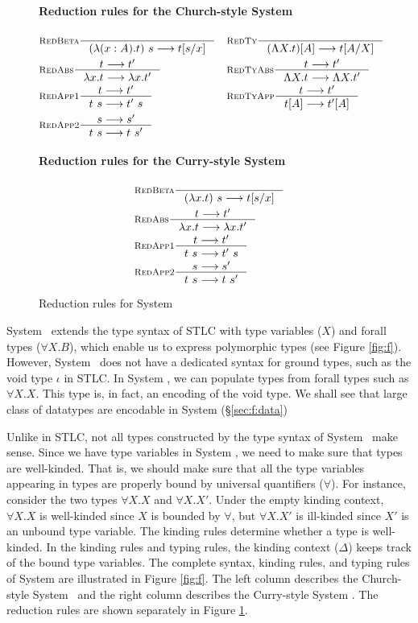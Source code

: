 \begin{figure}
\paragraph{Reduction rules for the Church-style System \F}
\begin{align*}
& \inference[\sc RedBeta]{}{(\l(x:A).t)~s --> t[s/x]}
&&\inference[\sc RedTy]{}{(\L X   .t)[A] --> t[A/X]} \\
& \inference[\sc RedAbs]{t --> t'}{\l x   .t --> \l x   .t'}
&&\inference[\sc RedTyAbs]{t --> t'}{\L X   .t --> \L X   .t'} \\
& \inference[\sc RedApp1]{t --> t'}{t~s --> t'~s}
&&\inference[\sc RedTyApp]{t --> t'}{t[A] --> t'[A]} \\
& \inference[\sc RedApp2]{s --> s'}{t~s --> t~s'}
\end{align*}
\paragraph{Reduction rules for the Curry-style System \F}
\begin{align*}
& \inference[\sc RedBeta]{}{(\l x   .t)~s --> t[s/x]} \\
& \inference[\sc RedAbs]{t --> t'}{\l x   .t --> \l x   .t'} \\
& \inference[\sc RedApp1]{t --> t'}{t~s --> t'~s} \\
& \inference[\sc RedApp2]{s --> s'}{t~s --> t~s'}
\end{align*}
\caption{Reduction rules for System \F}
\label{fig:redf}
\end{figure}

System \F\ extends the type syntax of STLC with type variables ($X$)
and forall types ($\forall X.B$), which enable us to express polymorphic types
(see Figure \ref{fig:f}). However, System \F\ does not have a dedicated syntax
for ground types, such as the void type $\iota$ in STLC. In System \F, we can
populate types from forall types such as $\forall X.X$. This type is, in fact,
an encoding of the void type. We shall see that large class of datatypes are
encodable in System \F (\S\ref{sec:f:data})

Unlike in STLC, not all types constructed by the type syntax of System \F\
make sense. Since we have type variables in System \F, we need to
make sure that types are well-kinded. That is, we should make sure
that all the type variables appearing in types are properly bound by
universal quantifiers ($\forall$). For instance, consider the two types
$\forall X.X$ and $\forall X.X'$. Under the empty kinding context,
$\forall X.X$ is well-kinded since $X$ is bounded by $\forall$, but
$\forall X.X'$ is ill-kinded since $X'$ is an unbound type variable.
The kinding rules determine whether a type is well-kinded.
In the kinding rules and typing rules, the kinding context ($\Delta$)
keeps track of the bound type variables. The complete syntax, kinding rules,
and typing rules of System \F are illustrated in Figure \ref{fig:f}.
The left column describes the Church-style System \F\ and the right
column describes the Curry-style System \F. The reduction rules are
shown separately in Figure \ref{fig:redf}.

